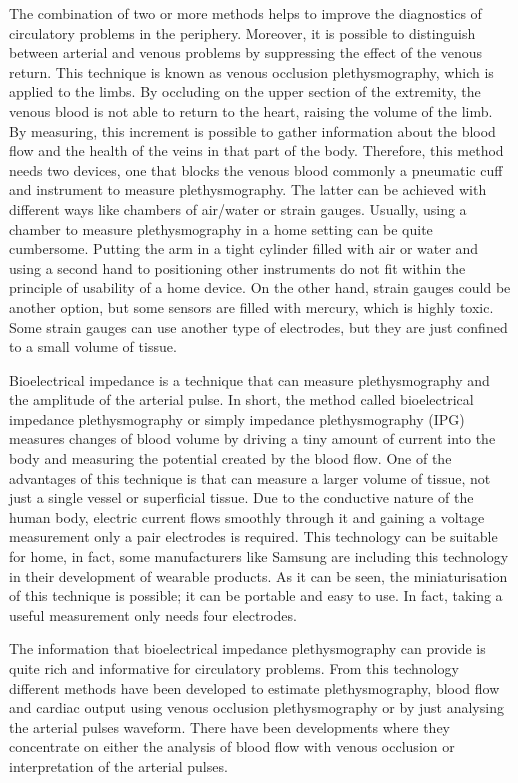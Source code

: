 The combination of two or more methods helps to improve the diagnostics of circulatory problems in the periphery. Moreover, it is possible to distinguish between arterial and venous problems by suppressing the effect of the venous return. This technique is known as venous occlusion plethysmography, which is applied to the limbs. By occluding on the upper section of the extremity, the venous blood is not able to return to the heart, raising the volume of the limb. By measuring, this increment is possible to gather information about the blood flow and the health of the veins in that part of the body. Therefore, this method needs two devices, one that blocks the venous blood commonly a pneumatic cuff and instrument to measure plethysmography. The latter can be achieved with different ways like chambers of air/water or strain gauges. Usually, using a chamber to measure plethysmography in a home setting can be quite cumbersome. Putting the arm in a tight cylinder filled with air or water and using a second hand to positioning other instruments do not fit within the principle of usability of a home device. On the other hand, strain gauges could be another option, but some sensors are filled with mercury, which is highly toxic. Some strain gauges can use another type of electrodes, but they are just confined to a small volume of tissue.

Bioelectrical impedance is a technique that can measure plethysmography and the amplitude of the arterial pulse. In short, the method called bioelectrical impedance plethysmography or simply impedance plethysmography (IPG) measures changes of blood volume by driving a tiny amount of current into the body and measuring the potential created by the blood flow. One of the advantages of this technique is that can measure a larger volume of tissue, not just a single vessel or superficial tissue. Due to the conductive nature of the human body, electric current flows smoothly through it and gaining a voltage measurement only a pair electrodes is required. This technology can be suitable for home, in fact, some manufacturers like Samsung \cite{simsense} are including this technology in their development of wearable products. As it can be seen, the miniaturisation of this technique is possible; it can be portable and easy to use. In fact, taking a useful measurement only needs four electrodes.

The information that bioelectrical impedance plethysmography can provide is quite rich and informative for circulatory problems. From this technology different methods have been developed to estimate plethysmography, blood flow and cardiac output using venous occlusion plethysmography or by just analysing the arterial pulses waveform. There have been developments where they concentrate on either the analysis of blood flow with venous occlusion or interpretation of the arterial pulses.

